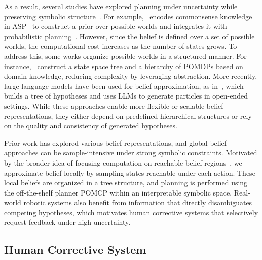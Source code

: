 As a result, several studies have explored planning under uncertainty while preserving symbolic structure~\cite{li2026uncertainty,sanner2010symbolic}. For example,~\cite{zhang2015corpp} encodes commonsense knowledge in ASP~\cite{lifschitz2019answer} to construct a prior over possible worlds and integrates it with probabilistic planning~\cite{kurniawati2008sarsop}. However, since the belief is defined over a set of possible worlds, the computational cost increases as the number of states grows. To address this, some works organize possible worlds in a structured manner. For instance,~\cite{serrano2021knowledge} construct a state space tree and a hierarchy of POMDPs based on domain knowledge, reducing complexity by leveraging abstraction. More recently, large language models have been used for belief approximation, as in~\cite{tang2025tru}, which builds a tree of hypotheses and uses LLMs to generate particles in open-ended settings. While these approaches enable more flexible or scalable belief representations, they either depend on predefined hierarchical structures or rely on the quality and consistency of generated hypotheses.

Prior work has explored various belief representations, and global belief approaches can be sample-intensive under strong symbolic constraints. Motivated by the broader idea of focusing computation on reachable belief regions~\cite{kurniawati2008sarsop}, we approximate belief locally by sampling states reachable under each action. These local beliefs are organized in a tree structure, and planning is performed using the off-the-shelf planner POMCP within an interpretable symbolic space. Real-world robotic systems also benefit from information that directly disambiguates competing hypotheses, which motivates human corrective systems that selectively request feedback under high uncertainty.


\subsection{Human Corrective System}~\label{rel:HCS}

